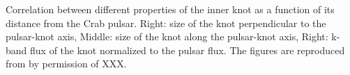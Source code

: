 \label{fig:knotcorr}
Correlation between different properties of the inner knot as a function of its distance from the Crab pulsar. Right: size of the knot perpendicular to the pulsar-knot axis, Middle: size of the knot along the pulsar-knot axis, Right: k-band flux of the knot normalized to the pulsar flux. The figures are reproduced from \citet{rudy2015} by permission of XXX.
